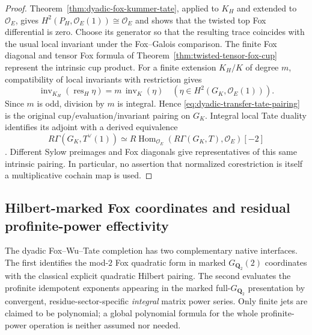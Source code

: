 \documentclass[11pt]{article}
\theoremstyle{definition}
\begin{document}
\begin{proof}
Theorem~\ref{thm:dyadic-fox-kummer-tate},
applied to $K_H$ and extended to $\mathcal O_E$,
gives $H^2(P_H,\mathcal O_E(1))\cong\mathcal O_E$
and shows that the twisted top Fox differential
is zero.  Choose its generator so that the
resulting trace coincides with the usual
local invariant under the Fox--Galois comparison.
The finite Fox diagonal and tensor Fox
formula of
Theorem~\ref{thm:twisted-tensor-fox-cup}
represent the intrinsic cup product.
For a finite extension $K_H/K$ of degree
$m$, compatibility of local invariants
with restriction gives
\[
\operatorname{inv}_{K_H}(\operatorname{res}_{H}\eta)
=m\,\operatorname{inv}_{K}(\eta)
\quad
(\eta\in H^2(G_K,\mathcal O_E(1))).
\]
Since $m$ is odd, division by $m$ is integral.
Hence \eqref{eq:dyadic-transfer-tate-pairing}
is the original cup/evaluation/invariant
pairing on $G_K$.
Integral local Tate duality identifies its
adjoint with a derived equivalence
\[
R\Gamma(G_K,T^\vee(1))
\simeq
R\operatorname{Hom}_{\mathcal O_E}
(R\Gamma(G_K,T),\mathcal O_E)[-2]
\]
\cite{NSW}.
Different Sylow preimages and Fox diagonals
give representatives of this same intrinsic
pairing.  In particular, no assertion that
normalized corestriction is itself a
multiplicative cochain map is used.
\end{proof}


\subsection{Hilbert-marked Fox coordinates and residual profinite-power effectivity}
\label{subsec:dyadic-hilbert-marked-power}

The dyadic Fox--Wu--Tate completion has two complementary native
interfaces.  The first identifies the mod-$2$ Fox quadratic form in
marked $G_{\mathbf Q_2}(2)$ coordinates with the classical explicit
quadratic Hilbert pairing.  The second evaluates the profinite
idempotent exponents appearing in the marked full-$G_{\mathbf Q_2}$
presentation by convergent, residue-sector-specific \emph{integral}
matrix power series.  Only finite jets are claimed to be polynomial;
a global polynomial formula for the whole profinite-power operation
is neither assumed nor needed.
\end{document}
